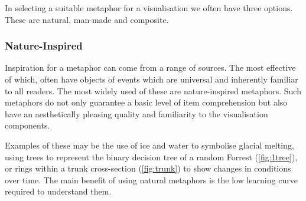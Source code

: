 In selecting a suitable metaphor for a visualisation we often have three options. These are natural, man-made and composite.

\subsubsection{Nature-Inspired}
Inspiration for a metaphor can come from a range of sources. The most effective of which, often have objects of events which are universal and inherently familiar to all readers. The most widely used of these are nature-inspired metaphors.
Such metaphors do not only guarantee a basic level of item comprehension but also have an aesthetically pleasing
quality and familiarity to the visualisation components.

Examples of these may be the use of ice and water to symbolise glacial melting, using trees to represent the binary decision tree of a random Forrest (\autoref{fig:1tree}), or rings within a trunk cross-section (\autoref{fig:trunk}) to show changes in conditions over time. The main benefit of using natural metaphors is the low learning curve required to understand them.


